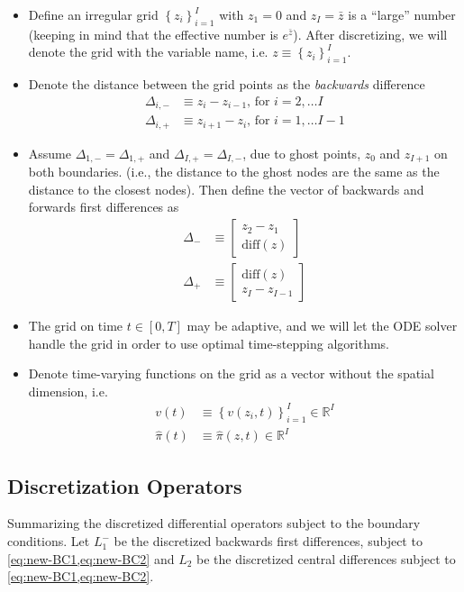 \documentclass[11pt]{article}
\newcommand{\R}{\ensuremath{\mathbb{R}}}
\newcommand{\set}[1]{\ensuremath{\left\{{#1}\right\}}}
\begin{document}
\begin{itemize}
	\item Define an irregular  grid $\set{z_i}_{i=1}^I$ with $z_1 = 0$ and $z_I = \bar{z}$ is a ``large'' number (keeping in mind that the effective number is $e^{\bar{z}}$).  After discretizing, we will denote the grid with the variable name, i.e. $z \equiv \set{z_i}_{i=1}^I$.
	\item Denote the distance between the grid points as the \textit{backwards} difference
	\begin{align}
	\Delta_{i,-} &\equiv z_i - z_{i-1},\, \text{for } i = 2,\ldots I\\
	\Delta_{i,+} &\equiv z_{i+1} - z_i,\, \text{for } i = 1,\ldots I-1
	\end{align}
	\item Assume $\Delta_{1, -} = \Delta_{1, +}$ and $\Delta_{I, +} = \Delta_{I, -}$, due to ghost points, $z_0$ and $z_{I+1}$ on both boundaries. (i.e., the distance to the ghost nodes are the same as the distance to the closest nodes).  Then define the vector of backwards and forwards first differences as
	\begin{align}
	\Delta_{-} &\equiv \begin{bmatrix} z_2 - z_1 \\
	\text{diff}(z)
	\end{bmatrix}\\
	\Delta_{+} &\equiv \begin{bmatrix} \text{diff}(z)\\
	z_I - z_{I-1}
	\end{bmatrix}
	\end{align}
	\item The grid on time $t \in [0,T]$ may be adaptive, and we will let the ODE solver handle the grid in order to use optimal time-stepping algorithms.
	\item Denote time-varying functions on the grid as a vector without the spatial dimension, i.e.
	\begin{align}
	v(t) &\equiv \set{v(z_i, t)}_{i=1}^I\in\R^I\\
	\hat{\pi}(t) &\equiv	\hat{\pi}(z,t) \in \R^I
	\end{align}
\end{itemize}

\subsection{Discretization Operators}\label{sec:discretization-operators}
Summarizing the discretized differential operators subject to the boundary conditions.  Let $L_1^{-}$ be the discretized backwards first differences, subject to \cref{eq:new-BC1,eq:new-BC2} and $L_2$ be the discretized central differences subject to \cref{eq:new-BC1,eq:new-BC2}.
\end{document}
